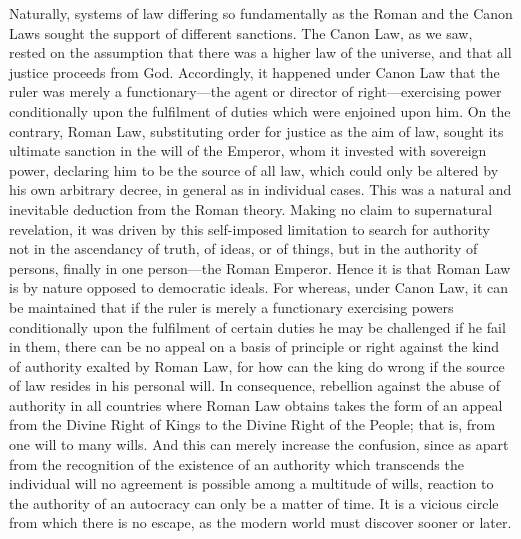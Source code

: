 \documentclass{book}
\begin{document}
Naturally, systems of law differing so fundamentally as the Roman and the Canon Laws sought the support of different sanctions. The Canon Law, as we saw, rested on the assumption that there was a higher law of the universe, and that all justice proceeds from God. Accordingly, it happened under Canon Law that the ruler was merely a functionary—the agent or director of right—exercising power conditionally upon the fulfilment of duties which were enjoined upon him. On the contrary, Roman Law, substituting order for justice as the aim of law, sought its ultimate sanction in the will of the Emperor, whom it invested with sovereign power, declaring him to be the source of all law, which could only be altered by his own arbitrary decree, in general as in individual cases. This was a natural and inevitable deduction from the Roman theory. Making no claim to supernatural revelation, it was driven by this self-imposed limitation to search for authority not in the ascendancy of truth, of ideas, or of things, but in the authority of persons, finally in one person—the Roman Emperor. Hence it is that Roman Law is by nature opposed to democratic ideals. For whereas, under Canon Law, it can be maintained that if the ruler is merely a functionary exercising powers conditionally upon the fulfilment of certain duties he may be challenged if he fail in them, there can be no appeal on a basis of principle or right against the kind of authority exalted by Roman Law, for how can the king do wrong if the source of law resides in his personal will. In consequence, rebellion against the abuse of authority in all countries where Roman Law obtains takes the form of an appeal from the Divine Right of Kings to the Divine Right of the People; that is, from one will to many wills. And this can merely increase the confusion, since as apart from the recognition of the existence of an authority which transcends the individual will no agreement is possible among a multitude of wills, reaction to the authority of an autocracy can only be a matter of time. It is a vicious circle from which there is no escape, as the modern world must discover sooner or later.
\end{document}
